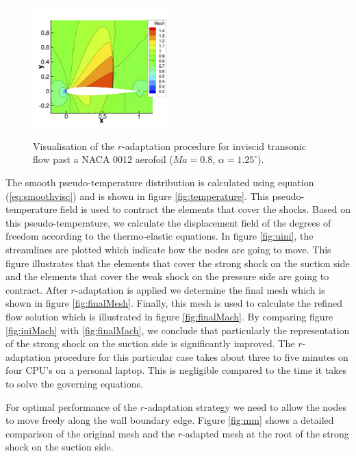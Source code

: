 \documentclass[review]{elsarticle}
\begin{document}
\begin{figure}[!htbp]
\begin{center}
{
\includegraphics[width=0.47\textwidth]{figures/Mr-trans.png}\label{fig:finalMach}
}
\caption{Visualisation of the $r$-adaptation procedure for inviscid transonic flow past a NACA 0012 aerofoil (${Ma=0.8}$, $\alpha = 1.25^\circ$).}
\label{default}
\end{center}
\end{figure}



The smooth pseudo-temperature distribution is calculated using equation (\ref{eq:smoothvisc}) and is shown in figure \ref{fig:temperature}. 
This pseudo-temperature field is used to contract the elements that cover the shocks. 
Based on this pseudo-temperature, we calculate the displacement field of the degrees of freedom according to the thermo-elastic equations.
In figure \ref{fig:uini}, the streamlines are plotted which indicate how the nodes are going to move. 
This figure illustrates that the elements that cover the strong shock on the suction side and the elements that cover the weak shock on the pressure side are going to contract. 
After $r$-adaptation is applied we determine the final mesh which is shown in figure \ref{fig:finalMesh}. 
Finally, this mesh is used to calculate the refined flow solution which is illustrated in figure \ref{fig:finalMach}.
By comparing figure \ref{fig:iniMach} with \ref{fig:finalMach}, we conclude that particularly the representation of the strong shock on the suction side is significantly improved.
The $r$-adaptation procedure for this particular case takes about three to five minutes on four CPU's on a personal laptop. This is negligible compared to the time it takes to solve the governing equations.
\par For optimal performance of the $r$-adaptation strategy we need to allow the nodes to move freely along the wall boundary edge. 
Figure \ref{fig:mm} shows a detailed comparison of the original mesh and the $r$-adapted mesh at the root of the strong shock on the suction side.
\end{document}
